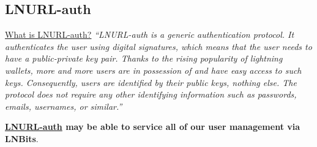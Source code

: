 \subsection{LNURL-auth}
\href{https://lightninglogin.live/learn}{What is LNURL-auth?}
\textit{``LNURL-auth is a generic authentication protocol. It authenticates the user using digital signatures, which means that the user needs to have a public-private key pair. Thanks to the rising popularity of lightning wallets, more and more users are in possession of and have easy access to such keys. Consequently, users are identified by their public keys, nothing else. The protocol does not require any other identifying information such as passwords, emails, usernames, or similar.''}\par
\textbf{\href{https://github.com/fiatjaf/lnurl-rfc/blob/legacy/lnurl-auth.md}{LNURL-auth} may be able to service all of our user management via LNBits}.
